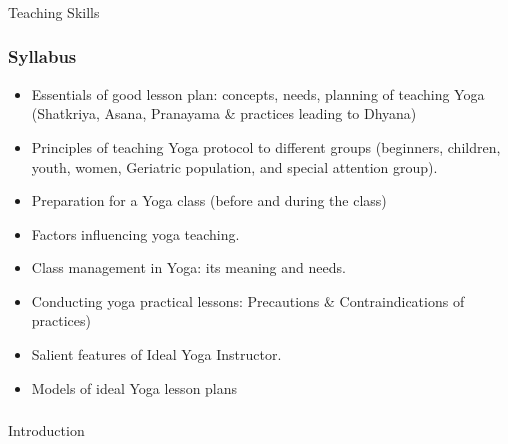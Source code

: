 \begin{frame}[fragile]\frametitle{}
\begin{center}
{\Large Teaching Skills }
\end{center}
\end{frame}

\begin{frame}[fragile]\frametitle{Syllabus}

\begin{itemize}
\item  Essentials  of  good  lesson  plan:  concepts,  needs,  planning  of  teaching  Yoga  (Shatkriya, Asana, Pranayama \& practices leading to Dhyana) 
\item  Principles  of  teaching  Yoga  protocol  to  different  groups  (beginners,  children,  youth, women, Geriatric population, and special attention group). 
\item  Preparation for a Yoga class (before and during the class) 
\item  Factors influencing yoga teaching. 
\item  Class management in Yoga: its meaning and needs. 
\item  Conducting yoga practical lessons: Precautions \& Contraindications of practices)  
\item  Salient features of Ideal Yoga Instructor.  
\item  Models of ideal Yoga lesson plans 
\end{itemize}
\end{frame}

\begin{frame}[fragile]\frametitle{}
\begin{center}
{\Large Introduction}
\end{center}
\end{frame}


